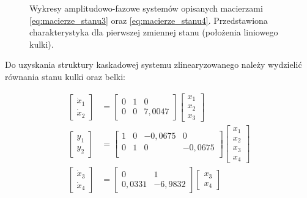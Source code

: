 \begin{figure}[ht]
    \centering
    
    \caption{Wykresy amplitudowo-fazowe systemów opisanych macierzami \eqref{eq:macierze_stanu3} oraz \eqref{eq:macierze_stanu4}. Przedstawiona charakterystyka dla pierwszej zmiennej stanu (położenia linio\-wego kulki).}
    \label{fig:charakterystyka_amplitudowo_fazowa}
\end{figure}

Do uzyskania struktury kaskadowej systemu zlinearyzowanego należy wydzielić równania stanu kulki oraz belki:

\begin{align}
\begin{bmatrix}
\dot{x}_1 \\ \dot{x}_2
\end{bmatrix}
&= \begin{bmatrix}
    0 & 1 & 0 \\
    0 & 0 & 7,0047
\end{bmatrix}
\begin{bmatrix}
    x_1 \\ x_2 \\ x_3
\end{bmatrix} \label{eq:rownania_stanu_kulki} \\
\begin{bmatrix}
    y_1 \\ y_2
\end{bmatrix}
&= \begin{bmatrix}
    1 & 0 & -0,0675 & 0 \\
    0 & 1 & 0 & -0,0675 \\
\end{bmatrix}
\begin{bmatrix}
x_1 \\ x_2 \\ x_3 \\ x_4
\end{bmatrix} \label{eq:rownania_wyjscia_kulki} \\
\begin{bmatrix}
    \dot{x}_3 \\ \dot{x}_4
\end{bmatrix}
&= \begin{bmatrix}
    0 & 1 \\
    0,0331 & -6,9832
\end{bmatrix}
\begin{bmatrix}
    x_3 \\ x_4
\end{bmatrix}

\end{align}
